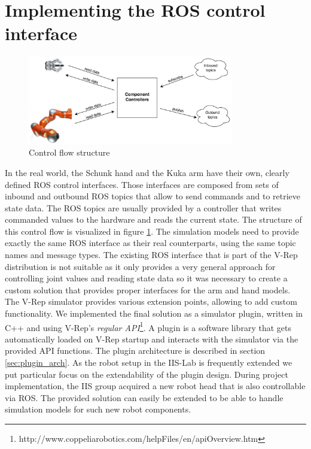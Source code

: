 \section{Implementing the ROS control interface}

\begin{figure}[htb]
	\centering
  	\includegraphics[width=0.8\textwidth]{images/control_flow.jpg}
	\caption{Control flow structure}
	\label{fig:control_flow}
\end{figure}

In the real world, the Schunk hand and the Kuka arm have their own, clearly defined ROS control interfaces. Those interfaces are composed from sets of inbound and outbound ROS topics that allow to send commands and to retrieve state data. The ROS topics are usually provided by a controller that writes commanded values to the hardware and reads the current state. The structure of this control flow is visualized in figure \ref{fig:control_flow}. The simulation models need to provide exactly the same ROS interface as their real counterparts, using the same topic names and message types. The existing ROS interface that is part of the V-Rep distribution is not suitable as it only provides a very general approach for controlling joint values and reading state data so it was necessary to create a custom solution that provides proper interfaces for the arm and hand models. \\

The V-Rep simulator provides various extension points, allowing to add custom functionality. We implemented the final solution as a simulator plugin, written in C++ and using V-Rep's \emph{regular API}\footnote{http://www.coppeliarobotics.com/helpFiles/en/apiOverview.htm}. A plugin is a software library that gets automatically loaded on V-Rep startup and interacts with the simulator via the provided API functions. The plugin architecture is described in section \ref{sec:plugin_arch}. As the robot setup in the IIS-Lab is frequently extended we put particular focus on the extendability of the plugin design. During project implementation, the IIS group acquired a new robot head that is also controllable via ROS. The provided solution can easily be extended to be able to handle simulation models for such new robot components. \\


